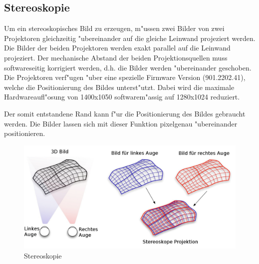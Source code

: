\subsection{Stereoskopie}
Um ein stereoskopisches Bild zu erzeugen, m"ussen zwei Bilder von zwei Projektoren gleichzeitig "ubereinander auf die gleiche Leinwand projeziert werden. Die Bilder der beiden Projektoren werden exakt parallel auf die Leinwand projeziert. Der mechanische Abstand der beiden Projektionsquellen muss softwareseitig korrigiert werden, d.h. die Bilder werden "ubereinander geschoben. Die Projektoren verf"ugen "uber eine spezielle Firmware Version (901.2202.41), welche die Positionierung des Bildes unterst"utzt. Dabei wird die maximale Hardwareaufl"osung von 1400x1050 softwarem"assig auf 1280x1024 reduziert.

Der somit entstandene Rand kann f"ur die Positionierung des Bildes gebraucht werden. Die Bilder lassen sich mit dieser Funktion pixelgenau "ubereinander positionieren.


\begin{figure}[ht]
\begin{center}
\includegraphics[scale=0.2]{../figures/stereoscopy}
\end{center}
\caption{Stereoskopie}
\end{figure}
